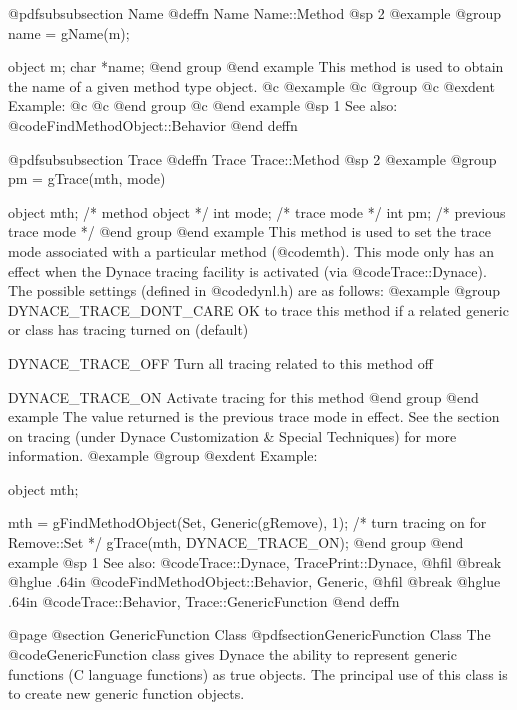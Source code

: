 @pdfsubsubsection {Name}
@deffn {Name} Name::Method
@sp 2
@example
@group
name = gName(m);

object  m;
char    *name;
@end group
@end example
This method is used to obtain the name of a given method type object.
@c @example
@c @group
@c @exdent Example:
@c 
@c @end group
@c @end example
@sp 1
See also:  @code{FindMethodObject::Behavior}
@end deffn














@pdfsubsubsection {Trace}
@deffn {Trace} Trace::Method
@sp 2
@example
@group
pm = gTrace(mth, mode)

object  mth;    /*  method object        */
int     mode;   /*  trace mode           */
int     pm;     /*  previous trace mode  */
@end group
@end example
This method is used to set the trace mode associated with a
particular method (@code{mth}).  This mode only has an effect
when the Dynace tracing facility is activated (via
@code{Trace::Dynace}).  The possible settings (defined in
@code{dynl.h}) are as follows:
@example
@group
DYNACE_TRACE_DONT_CARE   OK to trace this method if a
                         related generic or class has tracing
                         turned on (default)

DYNACE_TRACE_OFF         Turn all tracing related to this
                         method off

DYNACE_TRACE_ON          Activate tracing for this method
@end group
@end example
The value returned is the previous trace mode in effect.  See the
section on tracing (under Dynace Customization & Special Techniques) for
more information.
@example
@group
@exdent Example:

object  mth;

mth = gFindMethodObject(Set, Generic(gRemove), 1);
  /* turn tracing on for Remove::Set */
gTrace(mth, DYNACE_TRACE_ON);
@end group
@end example
@sp 1
See also:  @code{Trace::Dynace, TracePrint::Dynace,}
@hfil @break @hglue .64in @code{FindMethodObject::Behavior, Generic,}
@hfil @break @hglue .64in @code{Trace::Behavior, Trace::GenericFunction}
@end deffn










@page
@section GenericFunction Class
@pdfsection{GenericFunction Class}
The @code{GenericFunction} class gives Dynace the ability to represent
generic functions (C language functions) as true objects.  The principal
use of this class is to create new generic function objects.


